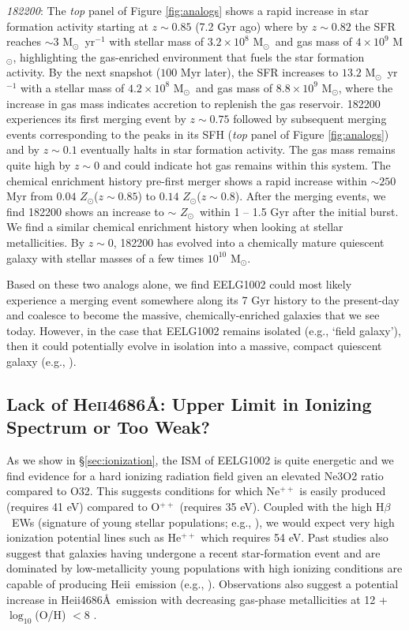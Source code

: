 \documentclass[twocolumn,tight,times,linenumbers]{aastex631}
\newcommand{\hbeta}{H$\beta$}
\newcommand{\heii}{He{\sc ii}}
\newcommand{\msol}{M$_\odot$}
\newcommand{\zsol}{$Z_\odot$}
\newcommand{\zzz}{{\color{red} ZZZ}}
\begin{document}
		\textit{182200}: The \textit{top} panel of Figure \ref{fig:analogs} shows a rapid increase in star formation activity starting at $z \sim 0.85$ (7.2 Gyr ago) where by $z \sim 0.82$ the SFR reaches $\sim 3$ \msol~yr$^{-1}$ with stellar mass of $3.2\times10^8$ \msol~and gas mass of $4 \times 10^9$ \msol, highlighting the gas-enriched environment that fuels the star formation activity. By the next snapshot ($100$ Myr later), the SFR increases to $13.2$ \msol~yr$^{-1}$ with a stellar mass of $4.2\times10^8$ \msol~and gas mass of $8.8\times10^9$ \msol, where the increase in gas mass indicates accretion to replenish the gas reservoir. 182200 experiences its first merging event by $z \sim 0.75$ followed by subsequent merging events corresponding to the peaks in its SFH (\textit{top} panel of Figure \ref{fig:analogs}) and by $z \sim 0.1$ eventually halts in star formation activity. The gas mass remains quite high by $z \sim 0$ and could indicate hot gas remains within this system. The chemical enrichment history pre-first merger shows a rapid increase within $\sim 250$ Myr from $0.04$ \zsol ($z \sim 0.85$) to $0.14$ \zsol ($z \sim 0.8$). After the merging events, we find 182200 shows an increase to $\sim$ \zsol~within 1 -- 1.5 Gyr after the initial burst. We find a similar chemical enrichment history when looking at stellar metallicities. By $z \sim 0$, 182200 has evolved into a chemically mature quiescent galaxy with stellar masses of a few times $10^{10}$ \msol. 
		
		Based on these two analogs alone, we find EELG1002 could most likely experience a merging event somewhere along its 7 Gyr history to the present-day and coalesce to become the massive, chemically-enriched galaxies that we see today. However, in the case that EELG1002 remains isolated (e.g., `field galaxy'), then it could potentially evolve in isolation into a massive, compact quiescent galaxy (e.g., \citealt{Barro2013,Zolotov2015}).%
		
		
		\subsection{Lack of He\textsc{ii}4686\AA: Upper Limit in Ionizing Spectrum or Too Weak?}
		
		As we show in \S\ref{sec:ionization}, the ISM of EELG1002 is quite energetic and we find evidence for a hard ionizing radiation field given an elevated Ne3O2 ratio compared to O32. This suggests conditions for which Ne$^{++}$ is easily produced (requires 41 eV) compared to O$^{++}$ (requires 35 eV).  Coupled with the high \hbeta~EWs (signature of young stellar populations; e.g., \citealt{Fernandes2003,Levesque2013}), we would expect very high ionization potential lines such as He$^{++}$ which requires 54 eV. Past studies also suggest that galaxies having undergone a recent star-formation event and are dominated by low-metallicity young populations with high ionizing conditions are capable of producing \heii~emission (e.g., \citealt{Schaerer2003,Saxena2020,Berg2021}). Observations also suggest a potential increase in \heii4686\AA~emission with decreasing gas-phase metallicities at 12 + $\log_{10}$(O/H) $ < 8$ \citep{Senchyna2019}. 
		
\end{document}
